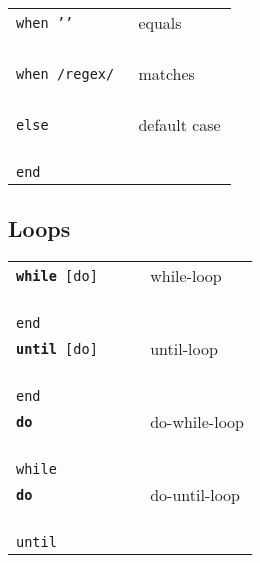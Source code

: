 \documentclass[6pt]{article}
\begin{document}
\begin{multicols}{3}
\begin{tabular}{L{0.55\linewidth} L{0.45\linewidth}}
    \tt when ''                  &  equals     \\
    \tt ~~                                                  \\
    \tt when /regex/                      &  matches  \\
    \tt ~~                                                  \\
    \tt else                              & default case                   \\
    \tt ~~                                                  \\
    \tt end                                                                \\

  \end{tabular}

  \subsection{Loops}
  \begin{tabular}{L{0.55\linewidth} L{0.45\linewidth}}
    \tt \textbf{while}  [do]    & while-loop                     \\
    \tt ~~                                                  \\
    \tt end                                                                \\
    \tt \textbf{until}  [do]    & until-loop                     \\
    \tt ~~                                                  \\
    \tt end                                                                \\
    \tt \textbf{do}                       & do-while-loop                  \\
    \tt ~~                                                  \\
    \tt while                                                    \\
    \tt \textbf{do}                       & do-until-loop                  \\
    \tt ~~                                                  \\
    \tt until                                                    \\
  \end{tabular}


\end{multicols}
\end{document}
